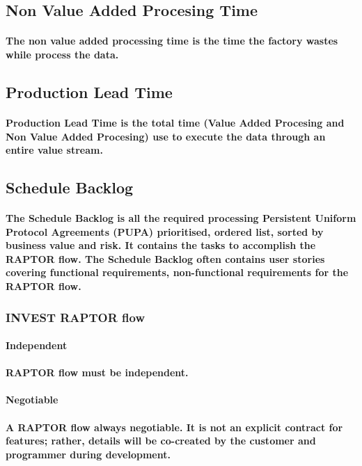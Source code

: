 \documentclass{acm_proc_article-sp}
\begin{document}
\subsection{Non Value Added Procesing Time}
\paragraph{The non value added processing time is the time the factory wastes while process the data.}
\subsection{Production Lead Time}
\paragraph{Production Lead Time is the total time (Value Added Procesing and Non Value Added Procesing) use to execute the data through an entire value stream.}
\subsection{Schedule Backlog}
\paragraph{The Schedule Backlog is all the required processing Persistent Uniform Protocol Agreements (PUPA) prioritised, ordered list, sorted by business value and risk. It contains the tasks to accomplish the RAPTOR flow. The Schedule Backlog often contains user stories covering functional requirements, non-functional requirements for the RAPTOR flow.}
\subsubsection{INVEST RAPTOR flow}
\paragraph{\textbf{Independent}}
\paragraph{RAPTOR flow must be independent.}
\paragraph{\textbf{Negotiable}}
\paragraph{A RAPTOR flow always negotiable. It is not an explicit contract for features; rather, details will be co-created by the customer and programmer during development.}
\end{document}

